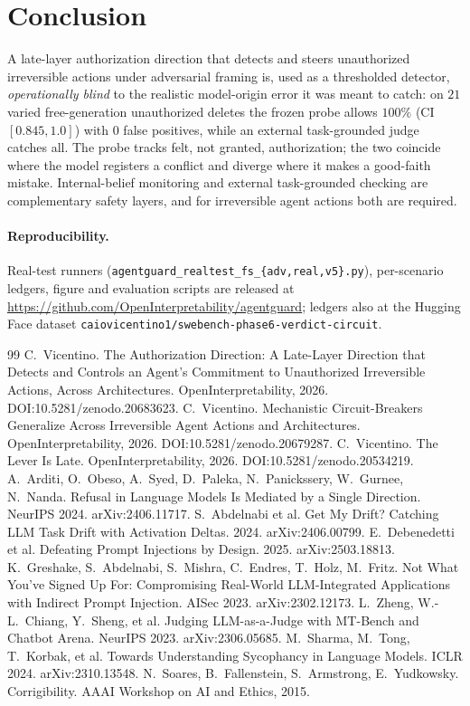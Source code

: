 \documentclass[11pt]{article}
\begin{document}
\section{Conclusion}
A late-layer authorization direction that detects and steers unauthorized irreversible actions under
adversarial framing is, used as a thresholded detector, \emph{operationally blind} to the realistic
model-origin error it was meant to catch: on $21$ varied free-generation unauthorized deletes the frozen
probe allows $100\%$ (CI $[0.845,1.0]$) with $0$ false positives, while an external task-grounded judge
catches all. The probe tracks felt, not granted, authorization; the two coincide where the model registers a
conflict and diverge where it makes a good-faith mistake. Internal-belief monitoring and external
task-grounded checking are complementary safety layers, and for irreversible agent actions both are required.

\paragraph{Reproducibility.} Real-test runners (\texttt{agentguard\_realtest\_fs\_\{adv,real,v5\}.py}),
per-scenario ledgers, figure and evaluation scripts are released at
\url{https://github.com/OpenInterpretability/agentguard}; ledgers also at the Hugging Face dataset
\texttt{caiovicentino1/swebench-phase6-verdict-circuit}.

\begin{thebibliography}{99}
 C.~Vicentino. The Authorization Direction: A Late-Layer Direction that Detects and
Controls an Agent's Commitment to Unauthorized Irreversible Actions, Across Architectures.
OpenInterpretability, 2026. DOI:10.5281/zenodo.20683623.
 C.~Vicentino. Mechanistic Circuit-Breakers Generalize Across Irreversible Agent
Actions and Architectures. OpenInterpretability, 2026. DOI:10.5281/zenodo.20679287.
 C.~Vicentino. The Lever Is Late. OpenInterpretability, 2026. DOI:10.5281/zenodo.20534219.
 A.~Arditi, O.~Obeso, A.~Syed, D.~Paleka, N.~Panickssery, W.~Gurnee, N.~Nanda. Refusal
in Language Models Is Mediated by a Single Direction. NeurIPS 2024. arXiv:2406.11717.
 S.~Abdelnabi et al. Get My Drift? Catching LLM Task Drift with Activation Deltas. 2024.
arXiv:2406.00799.
 E.~Debenedetti et al. Defeating Prompt Injections by Design. 2025. arXiv:2503.18813.
 K.~Greshake, S.~Abdelnabi, S.~Mishra, C.~Endres, T.~Holz, M.~Fritz. Not What You've
Signed Up For: Compromising Real-World LLM-Integrated Applications with Indirect Prompt Injection.
AISec 2023. arXiv:2302.12173.
 L.~Zheng, W.-L.~Chiang, Y.~Sheng, et al. Judging LLM-as-a-Judge with MT-Bench and Chatbot
Arena. NeurIPS 2023. arXiv:2306.05685.
 M.~Sharma, M.~Tong, T.~Korbak, et al. Towards Understanding Sycophancy in Language
Models. ICLR 2024. arXiv:2310.13548.
 N.~Soares, B.~Fallenstein, S.~Armstrong, E.~Yudkowsky. Corrigibility. AAAI Workshop
on AI and Ethics, 2015.
\end{thebibliography}
\end{document}
